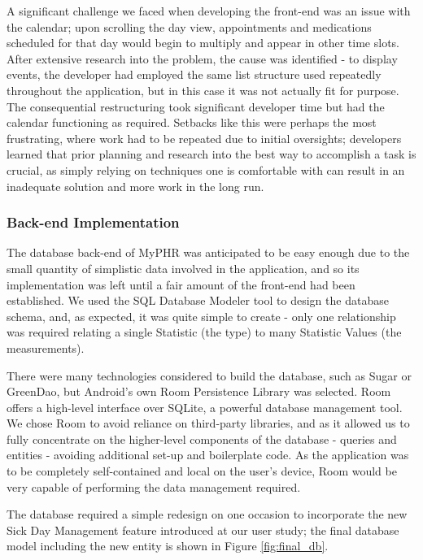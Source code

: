 \documentclass{l3proj}
\begin{document}
A significant challenge we faced when developing the front-end was an issue with the calendar; upon scrolling the day view, appointments and medications scheduled for that day would begin to multiply and appear in other time slots. After extensive research into the problem, the cause was identified - to display events, the developer had employed the same list structure used repeatedly throughout the application, but in this case it was not actually fit for purpose. The consequential restructuring took significant developer time but had the calendar functioning as required. Setbacks like this were perhaps the most frustrating, where work had to be repeated due to initial oversights; developers learned that prior planning and research into the best way to accomplish a task is crucial, as simply relying on techniques one is comfortable with can result in an inadequate solution and more work in the long run.

\subsubsection{Back-end Implementation} \label{sec:3.3.3}
The database back-end of MyPHR was anticipated to be easy enough due to the small quantity of simplistic data involved in the application, and so its implementation was left until a fair amount of the front-end had been established. We used the SQL Database Modeler tool \cite{sqldbm} to design the database schema, and, as expected, it was quite simple to create - only one relationship was required relating a single Statistic (the type) to many Statistic Values (the measurements).

There were many technologies considered to build the database, such as Sugar or GreenDao, but Android's own Room Persistence Library \cite{room} was selected. Room offers a high-level interface over SQLite, a powerful database management tool. We chose Room to avoid reliance on third-party libraries, and as it allowed us to fully concentrate on the higher-level components of the database - queries and entities -  avoiding additional set-up and boilerplate code. As the application was to be completely self-contained and local on the user’s device, Room would be very capable of performing the data management required.

The database required a simple redesign on one occasion to incorporate the new Sick Day Management feature introduced at our user study; the final database model including the new entity is shown in Figure \ref{fig:final_db}.
\end{document}
